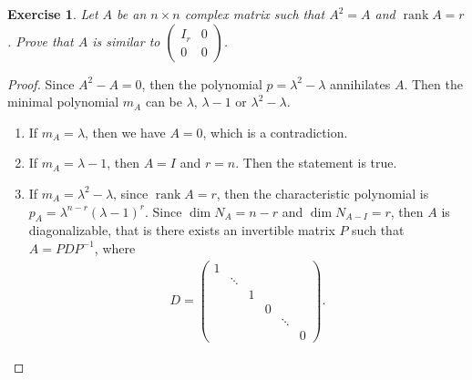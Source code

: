 \documentclass[11pt]{article}
\newtheorem{exercise}{Exercise}[section]
\theoremstyle{definition}
\numberwithin{equation}{subsection}
\begin{document}
\medskip

\begin{exercise}
Let $A$ be an $n \times n$ complex matrix such that $A^2 = A$ and $\operatorname{rank} A = r$. Prove that $A$ is similar to $\begin{pmatrix} I_r & 0 \\ 0 & 0 \end{pmatrix}$.
\end{exercise}
\begin{proof}
Since $A^2 - A = 0$, then the polynomial $p = \lambda^2 - \lambda$ annihilates $A$. Then the minimal polynomial $m_A$ can be $\lambda$, $\lambda - 1$ or $\lambda^2 - \lambda$.
\begin{enumerate}[label=(\alph*)]
    \item If $m_A = \lambda$, then we have $A = 0$, which is a contradiction.
    
    \item If $m_A = \lambda - 1$, then $A = I$ and $r = n$. Then the statement is true.
    
    \item If $m_A = \lambda^2 - \lambda$, since $\operatorname{rank} A = r$, then the characteristic polynomial is $p_A = \lambda^{n-r} (\lambda - 1)^r$. Since $\dim N_{A} = n - r$ and $\dim N_{A - I} = r$, then $A$ is diagonalizable, that is there exists an invertible matrix $P$ such that $A = PDP^{-1}$, where
    \begin{align*}
        D = \begin{pmatrix}
            1 & & & & & \\
            & \ddots & & & & \\
            & & 1 & & & \\
            & & & 0 & & \\
            & & & & \ddots & \\
            & & & & & 0
        \end{pmatrix}.
    \end{align*}
\end{enumerate}
\end{proof}

\medskip
\end{document}

